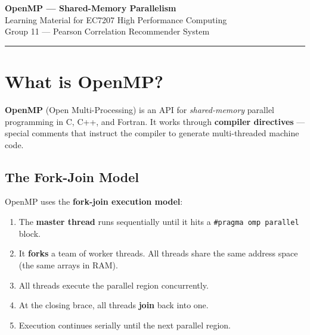 \documentclass[12pt,a4paper]{article}
\begin{document}

\begin{center}
    {\LARGE\bfseries OpenMP — Shared-Memory Parallelism}\\[0.5em]
    {\large Learning Material for EC7207 High Performance Computing}\\[0.3em]
    {\normalsize Group 11 — Pearson Correlation Recommender System}
\end{center}
\vspace{1em}\hrule\vspace{1.5em}

\section{What is OpenMP?}

\textbf{OpenMP} (Open Multi-Processing) is an API for \emph{shared-memory}
parallel programming in C, C++, and Fortran.  It works through
\textbf{compiler directives} — special comments that instruct the compiler to
generate multi-threaded machine code.

\subsection{The Fork-Join Model}

OpenMP uses the \textbf{fork-join execution model}:

\begin{center}
\end{center}

\begin{enumerate}
    \item The \textbf{master thread} runs sequentially until it hits a
          \texttt{\#pragma omp parallel} block.
    \item It \textbf{forks} a team of worker threads.  All threads share the
          same address space (the same arrays in RAM).
    \item All threads execute the parallel region concurrently.
    \item At the closing brace, all threads \textbf{join} back into one.
    \item Execution continues serially until the next parallel region.
\end{enumerate}
\end{document}

